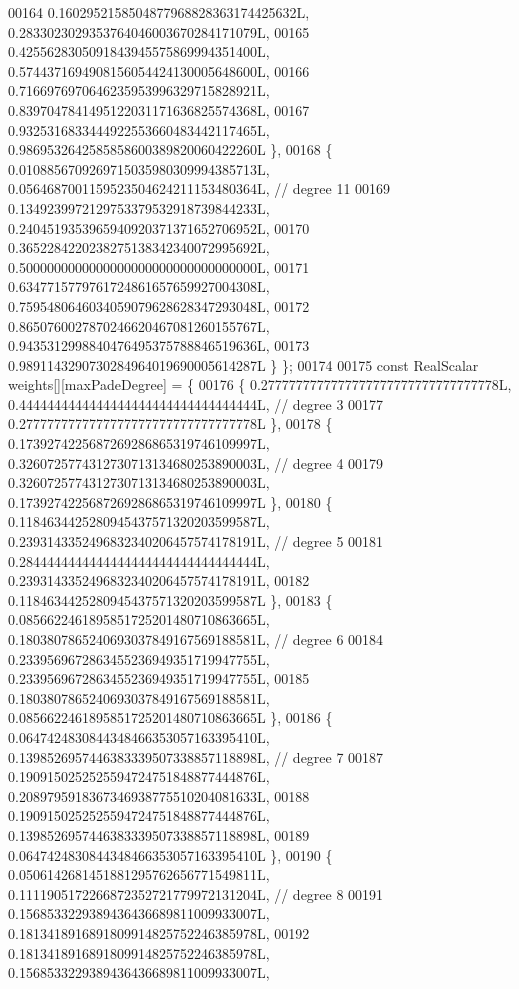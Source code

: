 \begin{DoxyCode}
00164       0.1602952158504877968828363174425632L, 0.2833023029353764046003670284171079L,
00165       0.4255628305091843945575869994351400L, 0.5744371694908156054424130005648600L,
00166       0.7166976970646235953996329715828921L, 0.8397047841495122031171636825574368L,
00167       0.9325316833444922553660483442117465L, 0.9869532642585858600389820060422260L \},
00168     \{ 0.0108856709269715035980309994385713L, 0.0564687001159523504624211153480364L,  \textcolor{comment}{// degree 11}
00169       0.1349239972129753379532918739844233L, 0.2404519353965940920371371652706952L,
00170       0.3652284220238275138342340072995692L, 0.5000000000000000000000000000000000L,
00171       0.6347715779761724861657659927004308L, 0.7595480646034059079628628347293048L,
00172       0.8650760027870246620467081260155767L, 0.9435312998840476495375788846519636L,
00173       0.9891143290730284964019690005614287L \} \};
00174 
00175   \textcolor{keyword}{const} RealScalar weights[][maxPadeDegree] = \{ 
00176     \{ 0.2777777777777777777777777777777778L, 0.4444444444444444444444444444444444L,  \textcolor{comment}{// degree 3}
00177       0.2777777777777777777777777777777778L \},
00178     \{ 0.1739274225687269286865319746109997L, 0.3260725774312730713134680253890003L,  \textcolor{comment}{// degree 4}
00179       0.3260725774312730713134680253890003L, 0.1739274225687269286865319746109997L \},
00180     \{ 0.1184634425280945437571320203599587L, 0.2393143352496832340206457574178191L,  \textcolor{comment}{// degree 5}
00181       0.2844444444444444444444444444444444L, 0.2393143352496832340206457574178191L,
00182       0.1184634425280945437571320203599587L \},
00183     \{ 0.0856622461895851725201480710863665L, 0.1803807865240693037849167569188581L,  \textcolor{comment}{// degree 6}
00184       0.2339569672863455236949351719947755L, 0.2339569672863455236949351719947755L,
00185       0.1803807865240693037849167569188581L, 0.0856622461895851725201480710863665L \},
00186     \{ 0.0647424830844348466353057163395410L, 0.1398526957446383339507338857118898L,  \textcolor{comment}{// degree 7}
00187       0.1909150252525594724751848877444876L, 0.2089795918367346938775510204081633L,
00188       0.1909150252525594724751848877444876L, 0.1398526957446383339507338857118898L,
00189       0.0647424830844348466353057163395410L \},
00190     \{ 0.0506142681451881295762656771549811L, 0.1111905172266872352721779972131204L,  \textcolor{comment}{// degree 8}
00191       0.1568533229389436436689811009933007L, 0.1813418916891809914825752246385978L,
00192       0.1813418916891809914825752246385978L, 0.1568533229389436436689811009933007L,

\end{DoxyCode}
